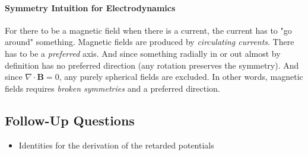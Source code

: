 \paragraph{Symmetry Intuition for Electrodynamics}
For there to be a magnetic field when there is a current, the current has to "go around" something. Magnetic fields are produced by \textit{circulating currents}. There has to be a \textit{preferred} axis. And since something radially in or out almost by definition has no preferred direction (any rotation preserves the symmetry). And since \(\nabla \cdot \mathbf{B} = 0\), any purely spherical fields are excluded. In other words, magnetic fields requires \textit{broken symmetries} and a preferred direction. 

\subsection*{Follow-Up Questions}
\begin{itemize}
    \item Identities for the derivation of the retarded potentials
\end{itemize}
